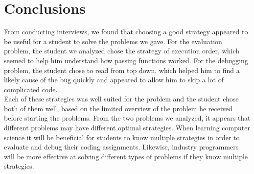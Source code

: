 \section{Conclusions}
From conducting interviews, we found that choosing a good strategy appeared to be useful for a student to solve the problems we gave. 
For the evaluation problem, the student we analyzed chose the strategy of execution order, which seemed to help him understand how passing functions worked. 
For the debugging problem, the student chose to read from top down, which helped him to find a likely cause of the bug quickly and appeared to allow him to skip a lot of complicated code.  \\

Each of these strategies was well suited for the problem and the student chose both of them well, based on the limited overview of the problem he received before starting the problems. 
From the two problems we analyzed, it appears that different problems may have different optimal strategies.
When learning computer science it will be beneficial for students to know multiple strategies in order to evaluate and debug their coding assignments. Likewise, industry programmers will be more effective at solving different types of problems if they know multiple strategies. \\

